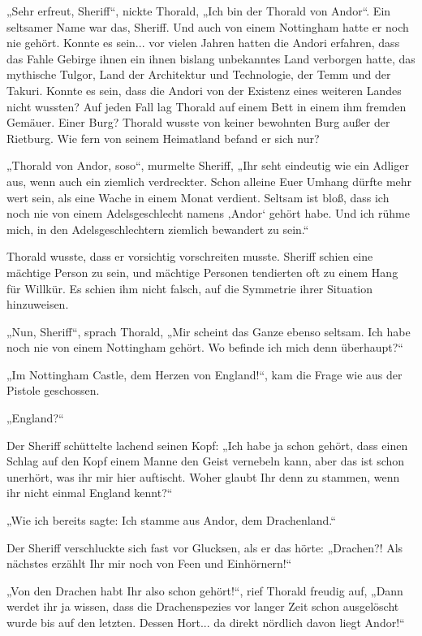 „Sehr erfreut, Sheriff“, nickte Thorald, „Ich bin der Thorald von Andor“. Ein seltsamer Name war das, Sheriff. Und auch von einem Nottingham hatte er noch nie gehört. Konnte es sein... vor vielen Jahren hatten die Andori erfahren, dass das Fahle Gebirge ihnen ein ihnen bislang unbekanntes Land verborgen hatte, das mythische Tulgor, Land der Architektur und Technologie, der Temm und der Takuri. Konnte es sein, dass die Andori von der Existenz eines weiteren Landes nicht wussten? Auf jeden Fall lag Thorald auf einem Bett in einem ihm fremden Gemäuer. Einer Burg? Thorald wusste von keiner bewohnten Burg außer der Rietburg. Wie fern von seinem Heimatland befand er sich nur?

„Thorald von Andor, soso“, murmelte Sheriff, „Ihr seht eindeutig wie ein Adliger aus, wenn auch ein ziemlich verdreckter. Schon alleine Euer Umhang dürfte mehr wert sein, als eine Wache in einem Monat verdient. Seltsam ist bloß, dass ich noch nie von einem Adelsgeschlecht namens ‚Andor‘ gehört habe. Und ich rühme mich, in den Adelsgeschlechtern ziemlich bewandert zu sein.“

Thorald wusste, dass er vorsichtig vorschreiten musste. Sheriff schien eine mächtige Person zu sein, und mächtige Personen tendierten oft zu einem Hang für Willkür. Es schien ihm nicht falsch, auf die Symmetrie ihrer Situation hinzuweisen.

„Nun, Sheriff“, sprach Thorald, „Mir scheint das Ganze ebenso seltsam. Ich habe noch nie von einem Nottingham gehört. Wo befinde ich mich denn überhaupt?“

„Im Nottingham Castle, dem Herzen von England!“, kam die Frage wie aus der Pistole geschossen.

„England?“

Der Sheriff schüttelte lachend seinen Kopf: „Ich habe ja schon gehört, dass einen Schlag auf den Kopf einem Manne den Geist vernebeln kann, aber das ist schon unerhört, was ihr mir hier auftischt. Woher glaubt Ihr denn zu stammen, wenn ihr nicht einmal England kennt?“

„Wie ich bereits sagte: Ich stamme aus Andor, dem Drachenland.“

Der Sheriff verschluckte sich fast vor Glucksen, als er das hörte: „Drachen?! Als nächstes erzählt Ihr mir noch von Feen und Einhörnern!“

„Von den Drachen habt Ihr also schon gehört!“, rief Thorald freudig auf, „Dann werdet ihr ja wissen, dass die Drachenspezies vor langer Zeit schon ausgelöscht wurde bis auf den letzten. Dessen Hort... da direkt nördlich davon liegt Andor!“

